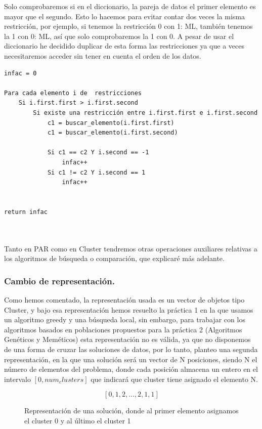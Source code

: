 \documentclass[12pt, spanish]{article}
\begin{document}
Solo comprobaremos si en el diccionario, la pareja de datos el primer elemento es mayor que el segundo. Esto lo hacemos para evitar contar dos veces la misma restricción, por ejemplo, si tenemos la restricción 0 con 1: ML, también tenemos la 1 con 0: ML, así que solo comprobaremos la 1 con 0. A pesar de usar el diccionario he decidido duplicar de esta forma las restricciones ya que a veces necesitaremos acceder sin tener en cuenta el orden de los datos.

\newpage

\begin{lstlisting}
infac = 0

Para cada elemento i de  restricciones
	Si i.first.first > i.first.second
		Si existe una restricción entre i.first.first e i.first.second
			c1 = buscar_elemento(i.first.first)
			c1 = buscar_elemento(i.first.second)
			
			Si c1 == c2 Y i.second == -1
				infac++
			Si c1 != c2 Y i.second == 1
				infac++
		
		
return infac
	
	
\end{lstlisting}




Tanto en PAR como en Cluster tendremos otras operaciones auxiliares relativas a los algoritmos de búsqueda o comparación, que explicaré más adelante.



\subsubsection{Cambio de representación.}

Como hemos comentado, la representación usada es un vector de objetos tipo Cluster, y bajo esa representación hemos resuelto la práctica 1 en la que usamos un algoritmo greedy y una búsqueda local, sin embargo, para trabajar con los algoritmos basados en poblaciones propuestos para la práctica 2 (Algoritmos Genéticos y Meméticos) esta representación no es válida, ya que no disponemos de una forma de cruzar las soluciones de datos, por lo tanto, planteo una segunda representación, en la que una solución será un vector de N posiciones, siendo N el número de elementos del problema, donde cada posición almacena un entero en el intervalo $[0, num_clusters]$ que indicará que cluster tiene asignado el elemento N.


\begin{figure}[H]
  \centering
      $$[0, 1, 2, ... , 2, 1, 1]$$
 		 \caption{Representación de una solución, donde al primer elemento asignamos el cluster 0 y al último el cluster 1}
  		\label{fig:ej_nueva_sol}
\end{figure}
\end{document}
